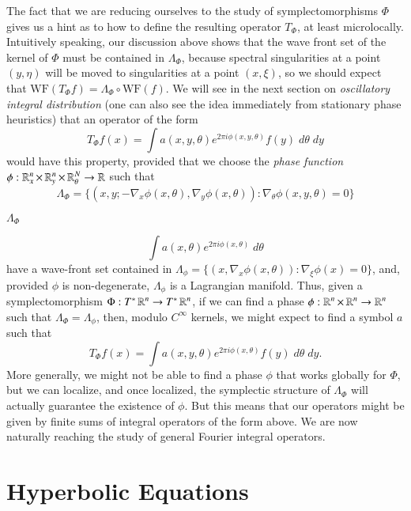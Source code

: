 The fact that we are reducing ourselves to the study of symplectomorphisms $\Phi$ gives us a hint as to how to define the resulting operator $T_\Phi$, at least microlocally. Intuitively speaking, our discussion above shows that the wave front set of the kernel of $\Phi$ must be contained in $\Lambda_\Phi$, because spectral singularities at a point $(y,\eta)$ will be moved to singularities at a point $(x,\xi)$, so we should expect that $\text{WF}(T_\Phi f) = \Lambda_\Phi \circ \text{WF}(f)$. We will see in the next section on \emph{oscillatory integral distribution} (one can also see the idea immediately from stationary phase heuristics) that an operator of the form
%
\[ T_\Phi f(x) = \int a(x,y,\theta) e^{2 \pi i \phi(x,y, \theta)} f(y)\; d\theta\; dy \]
%
would have this property, provided that we choose the \emph{phase function} $\phi: \operatorname{\mathbb{R}}^n_x \times \operatorname{\mathbb{R}}^n_y \times \operatorname{\mathbb{R}}^N_\theta \to \operatorname{\mathbb{R}}$ such that
%
\[ \Lambda_\Phi = \{ (x,y; - \nabla_x \phi(x,\theta), \nabla_y \phi(x,\theta) ) : \nabla_\theta \phi(x,y,\theta) = 0 \} \]

$\Lambda_\Phi$

%
\[ \int a(x,\theta) e^{2 \pi i \phi(x,\theta)}\; d\theta \]
%
have a wave-front set contained in $\Lambda_\phi = \{ (x,\nabla_x \phi(x,\theta)) : \nabla_\xi \phi(x) = 0 \}$, and, provided $\phi$ is non-degenerate, $\Lambda_\phi$ is a Lagrangian manifold. Thus, given a symplectomorphism $\Phi: T^* \operatorname{\mathbb{R}}^n \to T^* \operatorname{\mathbb{R}}^n$, if we can find a phase $\phi: \operatorname{\mathbb{R}}^n \times \operatorname{\mathbb{R}}^n \to \operatorname{\mathbb{R}}^n$ such that $\Lambda_\Phi = \Lambda_\phi$, then, modulo $C^\infty$ kernels, we might expect to find a symbol $a$ such that
%
\[ T_\Phi f(x) = \int a(x,y,\theta) e^{2 \pi i \phi(x,\theta)} f(y)\; d\theta\; dy. \]
%
More generally, we might not be able to find a phase $\phi$ that works globally for $\Phi$, but we can localize, and once localized, the symplectic structure of $\Lambda_\Phi$ will actually guarantee the existence of $\phi$. But this means that our operators might be given by finite sums of integral operators of the form above. We are now naturally reaching the study of general Fourier integral operators.

\section{Hyperbolic Equations}

